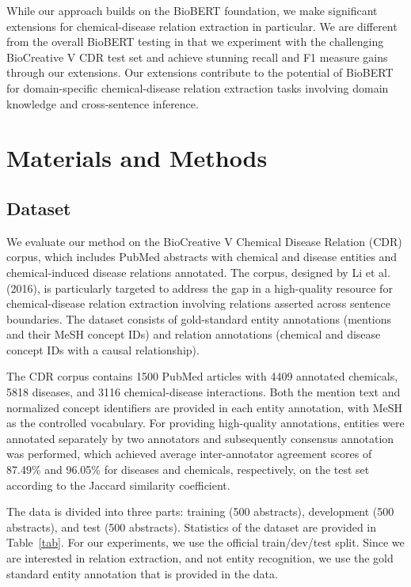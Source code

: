 \documentclass{amia}
\begin{document}
While our approach builds on the BioBERT foundation, we make significant extensions for chemical-disease relation extraction in particular. We are different from the overall BioBERT testing in that we experiment with the challenging BioCreative V CDR test set and achieve stunning recall and F1 measure gains through our extensions. Our extensions contribute to the potential of BioBERT for domain-specific chemical-disease relation extraction tasks involving domain knowledge and cross-sentence inference.

\section*{Materials and Methods}

\subsection*{Dataset}

We evaluate our method on the BioCreative V Chemical Disease Relation (CDR) corpus, which includes PubMed abstracts with chemical and disease entities and chemical-induced disease relations annotated. The corpus, designed by Li et al. (2016),   is particularly targeted to address the gap in a high-quality resource for chemical-disease relation extraction involving relations asserted across sentence boundaries. The dataset consists of gold-standard entity annotations (mentions and their MeSH concept IDs) and relation annotations (chemical and disease concept IDs with a causal relationship).

The CDR corpus contains 1500   PubMed articles with 4409   annotated chemicals, 5818   diseases, and 3116   chemical-disease interactions. Both the mention text and normalized concept identifiers are provided in each entity annotation, with MeSH as the controlled vocabulary. For providing high-quality annotations, entities were annotated separately by two annotators and subsequently consensus annotation was performed, which achieved average inter-annotator agreement scores of 87.49\% and 96.05\% for diseases and chemicals, respectively, on the test set according to the Jaccard similarity coefficient.

The data is divided into three parts: training (500 abstracts), development (500 abstracts), and test (500 abstracts). Statistics of the dataset are provided in Table~\ref{tab}. For our experiments, we use the official train/dev/test split. Since we are interested in relation extraction, and not entity recognition, we use the gold standard entity annotation that is provided in the data.
\end{document}

